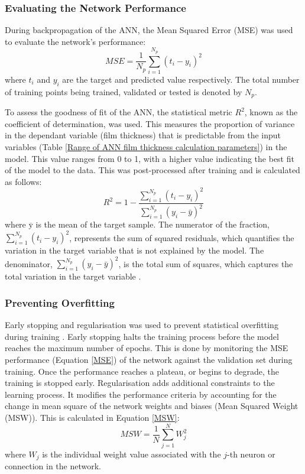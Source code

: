 \subsubsection{Evaluating the Network Performance}

During backpropagation of the ANN, the Mean Squared Error (MSE) was used to evaluate the network's performance:
\begin{equation}\label{MSE}
	M S E=\frac{1}{N_p} \sum_{i=1}^{N_p}\left(t_i-y_i\right)^2
\end{equation}
where $t_i$ and $y_i$ are the target and predicted value respectively. The total number of training points being trained, validated or tested is denoted by $N_p$. 

To assess the goodness of fit of the ANN, the statistical metric $R^2$, known as the coefficient of determination, was used. This measures the proportion of variance in the dependant variable (film thickness) that is predictable from the input variables (Table \ref{Range of ANN film thickness calculation parameters}) in the model. This value ranges from 0 to 1, with a higher value indicating the best fit of the model to the data. This was post-processed after training and is calculated as follows:
\begin{equation}\label{R-squared}
	R^2=1-\frac{\sum_{i=1}^{N_p}\left(t_i-y_i\right)^2}{\sum_{i=1}^{N_p}\left(y_i-\bar{y}\right)^2}
\end{equation}
 where $\overline{\mathrm{y}}$ is the mean of the target sample. The numerator of the fraction, \( \sum_{i=1}^{N_p}(t_i - y_i)^2 \), represents the sum of squared residuals, which quantifies the variation in the target variable that is not explained by the model. The denominator, \( \sum_{i=1}^{N_p}(y_i - \bar{y})^2 \), is the total sum of squares, which captures the total variation in the target variable \cite{Marian2022}.

\subsubsection{Preventing Overfitting} \label{Preventing overfitting}

Early stopping and regularisation was used to prevent statistical overfitting during training \cite{MatlabOverfit}. Early stopping halts the training process before the model reaches the maximum number of epochs. This is done by monitoring the MSE performance (Equation \ref{MSE}) of the network against the validation set during training. Once the performance reaches a plateau, or begins to degrade, the training is stopped early. Regularisation adds additional constraints to the learning process. It modifies the performance criteria by accounting for the change in mean square of the network weights and biases (Mean Squared Weight (MSW)). This is calculated in Equation \ref{MSW}: 
\begin{equation}\label{MSW}
	M S W=\frac{1}{N} \sum_{j=1}^N W_j^2
\end{equation}
where $W_j$ is the individual weight value associated with the $j$-th neuron or connection in the network.

